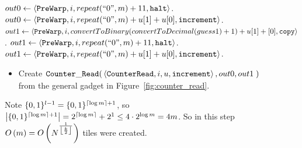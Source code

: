 \begin{itemize}
\begin{algorithm}
\begin{algorithmic}[1]
                \Else
                        \State $out0 \gets \left\langle {\tt PreWarp}, i, repeat(``0", m) + 11, {\tt halt} \right\rangle$.
                    \Else
                        \State $out0 \gets \left\langle {\tt PreWarp}, i, repeat(``0", m) + u[1] + u[0], {\tt increment} \right\rangle$.
                    \EndIf
                \EndIf
                    \State $out1 \gets \left\langle {\tt PreWarp}, i, convertToBinary(convertToDecimal(guess1) + 1) + u[1] + [0], {\tt copy} \right\rangle$.
                \Else
                        \State $out1 \gets \left\langle {\tt PreWarp}, i, repeat(``0", m) + 11, {\tt halt} \right\rangle$.
                    \Else
                        \State $out1 \gets \left\langle {\tt PreWarp}, i, repeat(``0", m) + u[1] + u[0], {\tt increment} \right\rangle$.
                    \EndIf
                \EndIf
            \EndFunction
        \end{algorithmic}
    \end{algorithm}

    \begin{itemize}
        \item
        Create $\begin{aligned}[t]
                   \cread(& \left\langle {\tt CounterRead}, i, u, {\tt increment} \right\rangle, out0, out1 \;)
               \end{aligned}$\\from the general gadget in Figure~\ref{fig:counter_read}.
    \end{itemize}
    Note $\{0, 1 \}^{l-1} = \{0, 1\}^{\ceil*{\log m} + 1}$, so $\left| {\{0, 1\}^{\ceil*{\log m} + 1}} \right| = 2^{\ceil*{\log m}} + 2^1 \leq 4 \cdot 2^{\log m} = 4m$.
    So in this step $O\left(m \right) = O\left( \upperbound \right)$ tiles were created.

\end{itemize}


